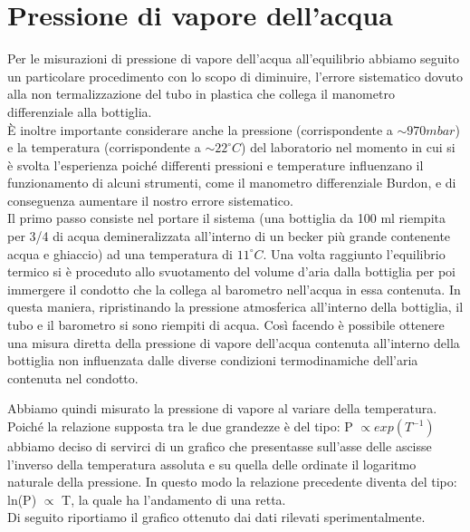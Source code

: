 \documentclass[11pt]{article}
\begin{document}
\section{Pressione di vapore dell'acqua}
Per le misurazioni di pressione di vapore dell'acqua all'equilibrio abbiamo seguito un particolare procedimento con lo scopo di diminuire, l'errore sistematico dovuto alla non termalizzazione del tubo in plastica che collega il manometro differenziale alla bottiglia.\\
È inoltre importante considerare anche la pressione  (corrispondente a $\sim 970 mbar$) e la temperatura (corrispondente a $\sim 22^\circ C$) del laboratorio nel momento in cui si è svolta l'esperienza poiché differenti pressioni e temperature influenzano il funzionamento di alcuni strumenti, come il manometro differenziale Burdon, e di conseguenza aumentare il nostro errore sistematico.\\
Il primo passo consiste nel portare il sistema (una bottiglia da 100 ml riempita per 3/4 di acqua demineralizzata all'interno di un becker più grande contenente acqua e ghiaccio) ad una temperatura di $11^\circ C$. Una volta raggiunto l'equilibrio termico si è proceduto allo svuotamento del volume d'aria dalla bottiglia per poi immergere il condotto che la collega al barometro nell'acqua in essa contenuta. In questa maniera, ripristinando la pressione atmosferica  all'interno della bottiglia, il tubo e il barometro si sono riempiti di acqua. Così facendo è possibile ottenere una misura diretta della pressione di vapore dell'acqua contenuta all'interno della bottiglia non influenzata dalle diverse condizioni termodinamiche dell'aria contenuta nel condotto.
 

Abbiamo quindi misurato la pressione di vapore al variare della temperatura. Poiché la relazione supposta tra le due grandezze è del tipo: P $\propto exp(T^{-1})$ abbiamo deciso di servirci di un grafico che presentasse sull'asse delle ascisse l'inverso della temperatura assoluta e su quella delle ordinate il logaritmo naturale della pressione. In questo modo la relazione precedente diventa del tipo: ln(P) $\propto$ T, la quale ha l'andamento di una retta.\\
Di seguito riportiamo il grafico ottenuto dai dati rilevati sperimentalmente.
\end{document}
